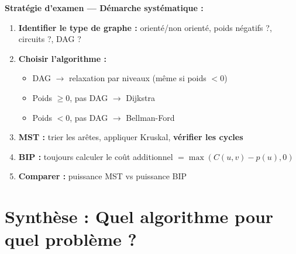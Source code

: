 \documentclass[12pt,a4paper]{article}
\begin{document}
\begin{attention}
\textbf{Strat\'egie d'examen --- D\'emarche syst\'ematique :}
\begin{enumerate}[nosep]
    \item \textbf{Identifier le type de graphe :} orient\'e/non orient\'e, poids n\'egatifs ?, circuits ?, DAG ?
    \item \textbf{Choisir l'algorithme :}
    \begin{itemize}[nosep]
        \item DAG $\to$ relaxation par niveaux (m\^eme si poids $< 0$)
        \item Poids $\geq 0$, pas DAG $\to$ Dijkstra
        \item Poids $< 0$, pas DAG $\to$ Bellman-Ford
    \end{itemize}
    \item \textbf{MST :} trier les ar\^etes, appliquer Kruskal, \textbf{v\'erifier les cycles}
    \item \textbf{BIP :} toujours calculer le co\^ut additionnel $= \max(C(u,v) - p(u), 0)$
    \item \textbf{Comparer :} puissance MST vs puissance BIP
\end{enumerate}
\end{attention}


\newpage
\section*{Synth\`ese : Quel algorithme pour quel probl\`eme ?}
\end{document}
